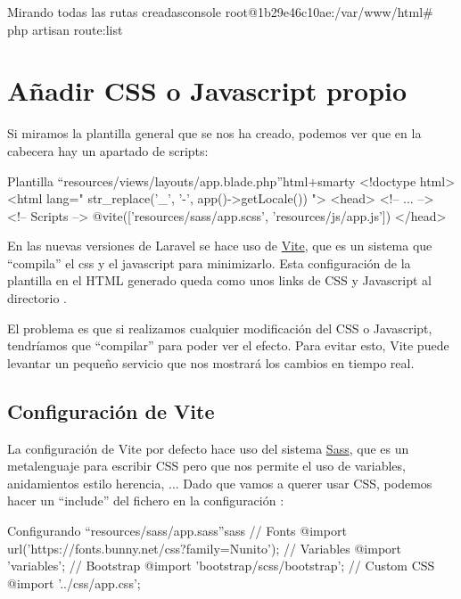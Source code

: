 \begin{mycode}{Mirando todas las rutas creadas}{console}{}
root@1b29e46c10ae:/var/www/html# php artisan route:list
\end{mycode}


\chapter{Añadir CSS o Javascript propio}

Si miramos la plantilla general  que se nos ha creado, podemos ver que en la cabecera hay un apartado de scripts:

\begin{mycode}{Plantilla “resources/views/layouts/app.blade.php”}{html+smarty}{}
<!doctype html>
<html lang="{{ str_replace('_', '-', app()->getLocale()) }}">
  <head>
  <!-- ... -->
  <!-- Scripts -->
  @vite(['resources/sass/app.scss', 'resources/js/app.js'])
</head>
\end{mycode}

En las nuevas versiones de Laravel se hace uso de \href{https://vitejs.dev/}{Vite}, que es un sistema que “compila” el css y el javascript para minimizarlo. Esta configuración de la plantilla en el HTML generado queda como unos links de CSS y Javascript al directorio .


El problema es que si realizamos cualquier modificación del CSS o Javascript, tendríamos que “compilar” para poder ver el efecto. Para evitar esto, Vite puede levantar un pequeño servicio que nos mostrará los cambios en tiempo real.

\section{Configuración de Vite}

La configuración de Vite por defecto hace uso del sistema \href{https://es.wikipedia.org/wiki/Sass}{Sass}, que es un metalenguaje para escribir CSS pero que nos permite el uso de variables, anidamientos estilo herencia, ... Dado que vamos a querer usar CSS, podemos hacer un “include” del fichero  en la configuración :


\begin{mycode}{Configurando “resources/sass/app.sass”}{sass}{}
// Fonts
@import url('https://fonts.bunny.net/css?family=Nunito');
// Variables
@import 'variables';
// Bootstrap
@import 'bootstrap/scss/bootstrap';
// Custom CSS
@import '../css/app.css';
\end{mycode}

